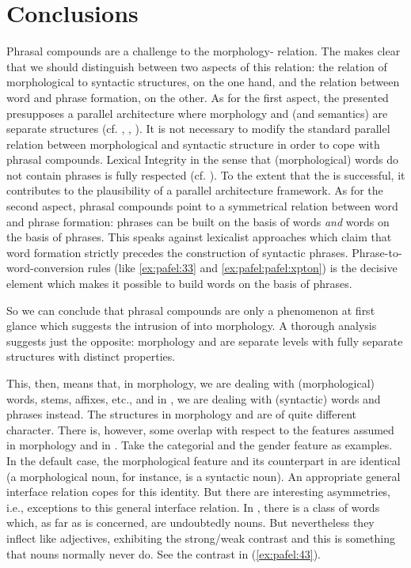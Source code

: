 \documentclass[output=paper]{LSP/langsci}
\begin{document}
\section{Conclusions}

Phrasal compounds are a challenge to the morphology- relation. The  makes clear that we should distinguish between two aspects of this relation: the relation of morphological to syntactic structures, on the one hand, and the relation between word and phrase formation, on the other. As for the first aspect, the  presented presupposes a parallel architecture where morphology and  (and semantics) are separate structures (cf. \citealt{Bresnan2001}, \citealt{Spencer2010}, \citealt{Trips2016}). It is not necessary to modify the standard parallel relation between morphological and syntactic structure in order to cope with phrasal compounds. Lexical Integrity in the sense that (morphological) words do not contain phrases is fully respected (cf. \citealt{Pafel2015}). To the extent that the  is successful, it contributes to the plausibility of a parallel architecture framework. As for the second aspect, phrasal compounds point to a symmetrical relation between word and phrase formation: phrases can be built on the basis of words \textit{and} words on the basis of phrases. This speaks against lexicalist approaches which claim that word formation strictly precedes the construction of syntactic phrases. Phrase-to-word-conversion rules (like \ref{ex:pafel:33} and \ref{ex:pafel:pafel:xpton}) is the decisive element which makes it possible to build words on the basis of phrases.
 
So we can conclude that phrasal compounds are only a phenomenon at first glance which suggests the intrusion of  into morphology. A thorough analysis suggests just the opposite: morphology and  are separate levels with fully separate structures with distinct properties.

This, then, means that, in morphology, we are dealing with (morphological) words, stems, affixes, etc., and in , we are dealing with (syntactic) words and phrases instead. The structures in morphology and  are of quite different character. There is, however, some overlap with respect to the features assumed in morphology and in . Take the categorial and the gender feature as examples. In the default case, the morphological feature and its counterpart in  are identical (a morphological noun, for instance, is a syntactic noun). An appropriate general interface relation copes for this identity. But there are interesting asymmetries, i.e., exceptions to this general interface relation. In , there is a class of words which, as far as  is concerned, are undoubtedly nouns. But nevertheless they inflect like adjectives, exhibiting the strong/weak contrast and this is something that nouns normally never do. See the contrast in (\ref{ex:pafel:43}).
\end{document}
